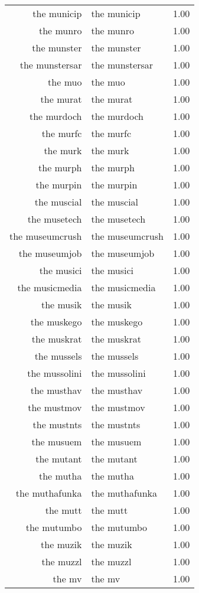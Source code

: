 \begin{table}[ht]
\begin{tabular}{rlr}
  the municip & the municip & 1.00 \\ 
  the munro & the munro & 1.00 \\ 
  the munster & the munster & 1.00 \\ 
  the munstersar & the munstersar & 1.00 \\ 
  the muo & the muo & 1.00 \\ 
  the murat & the murat & 1.00 \\ 
  the murdoch & the murdoch & 1.00 \\ 
  the murfc & the murfc & 1.00 \\ 
  the murk & the murk & 1.00 \\ 
  the murph & the murph & 1.00 \\ 
  the murpin & the murpin & 1.00 \\ 
  the muscial & the muscial & 1.00 \\ 
  the musetech & the musetech & 1.00 \\ 
  the museumcrush & the museumcrush & 1.00 \\ 
  the museumjob & the museumjob & 1.00 \\ 
  the musici & the musici & 1.00 \\ 
  the musicmedia & the musicmedia & 1.00 \\ 
  the musik & the musik & 1.00 \\ 
  the muskego & the muskego & 1.00 \\ 
  the muskrat & the muskrat & 1.00 \\ 
  the mussels & the mussels & 1.00 \\ 
  the mussolini & the mussolini & 1.00 \\ 
  the musthav & the musthav & 1.00 \\ 
  the mustmov & the mustmov & 1.00 \\ 
  the mustnts & the mustnts & 1.00 \\ 
  the musuem & the musuem & 1.00 \\ 
  the mutant & the mutant & 1.00 \\ 
  the mutha & the mutha & 1.00 \\ 
  the muthafunka & the muthafunka & 1.00 \\ 
  the mutt & the mutt & 1.00 \\ 
  the mutumbo & the mutumbo & 1.00 \\ 
  the muzik & the muzik & 1.00 \\ 
  the muzzl & the muzzl & 1.00 \\ 
  the mv & the mv & 1.00 \\ 

\end{tabular}
\end{table}
